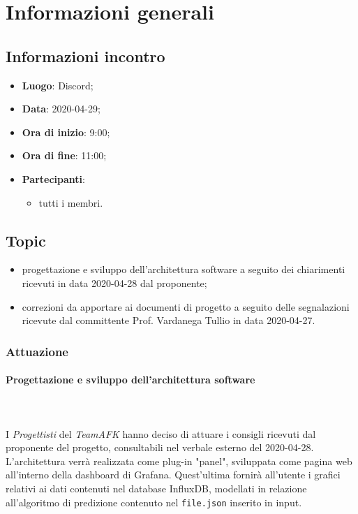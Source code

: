 \section{Informazioni generali}
\subsection{Informazioni incontro}
\begin{itemize}
\item \textbf{Luogo}: Discord;
\item \textbf{Data}: 2020-04-29;
\item \textbf{Ora di inizio}: 9:00;
\item \textbf{Ora di fine}: 11:00;
\item \textbf{Partecipanti}:
	\begin{itemize}
		\item tutti i membri.
	\end{itemize}
\end{itemize}

\subsection{Topic}
\begin{itemize}
\item progettazione e sviluppo dell'architettura software a seguito dei chiarimenti ricevuti in data 2020-04-28 dal proponente;
\item correzioni da apportare ai documenti di progetto a seguito delle segnalazioni ricevute dal committente Prof. Vardanega Tullio in data 2020-04-27.
\end{itemize}

\subsubsection{Attuazione}

\paragraph{Progettazione e sviluppo dell'architettura software} \mbox{} \\ \mbox{} \\
I \textit{Progettisti} del \textit{TeamAFK} hanno deciso di attuare i consigli ricevuti dal proponente del progetto, consultabili nel verbale esterno del 2020-04-28. \\
L'architettura verrà realizzata come plug-in "panel", sviluppata come pagina web all'interno della dashboard di Grafana. Quest'ultima fornirà all'utente i grafici relativi ai dati contenuti nel database InfluxDB, modellati in relazione all'algoritmo di predizione contenuto nel \texttt{file.json} inserito in input.

